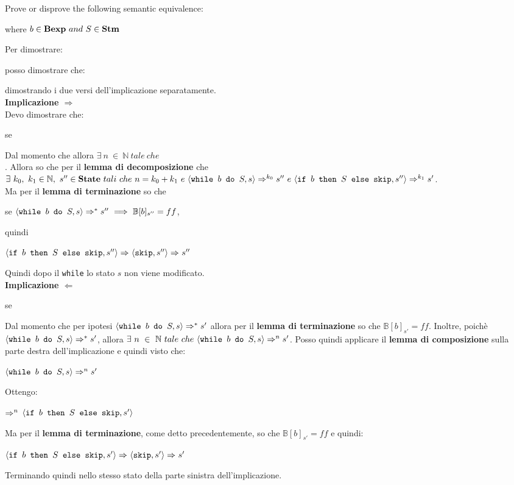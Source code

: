 {
	Prove or disprove the following semantic equivalence:
	\begin{center}
	\exFive{}
	\end{center}
	where $b\in\bexp~and~S\in\stm$
}
{
	Per dimostrare:
	\begin{center}
	\exFive{}
	\end{center}
	posso dimostrare che:
	\begin{center}
	\exFiveIff{}
	\end{center}
	dimostrando i due versi dell'implicazione separatamente.\\

	\textbf{Implicazione $\Longrightarrow{}$}\\
	Devo dimostrare che:
	\begin{center}
	se \exFiveLtR{}
	\end{center}
	Dal momento che \exFiveR{*} allora $\exists~n~\in~\mathbb{N}~tale~che$\\
	. Allora so che per il \textbf{lemma di decomposizione} che 
	$\exists{}~k_0,~k_1\in\mathbb{N},~s''\in\states~tali~che~n=k_0+k_1~e~
	\confSs{\wbS{b}{S}}{s}\Rar{k_0}s''~e~
	\confSs{\ifABC{b}{S}{\skipistr}}{s''}\Rar{k_1}s'$. \\
	Ma per il \textbf{lemma di terminazione} so che 
	\begin{center}
	se $\confSs{\wbS{b}{S}}{s}\Rar{*}s''~\Longrightarrow{}~\mathbb{B}[b]_{s''}=ff$,
	\end{center}
	quindi 
	\begin{center}
	$\confSs{\ifABC{b}{S}{\skipistr}}{s''}\Rar{}
	\confSs{\skipistr}{s''}\Rar{}s''$
	\end{center}
	Quindi dopo il \texttt{while} lo stato $s$ non viene modificato.\\

	\textbf{Implicazione $\Longleftarrow{}$}\\
	\begin{center}
	se \exFiveRtL{}
	\end{center}
	Dal momento che per ipotesi $\confSs{\wbS{b}{S}}{s}\Rar{*}{s'}$ allora
	per il \textbf{lemma di terminazione} so che $\mathbb{B}[b]_{s'}=ff$.
	Inoltre, poichè $\confSs{\wbS{b}{S}}{s}\Rar{*}{s'}$, allora 
	$\exists~n~\in~\mathbb{N}~tale~che~\confSs{\wbS{b}{S}}{s}\Rar{n}{s'}$.
	Posso quindi applicare il \textbf{lemma di composizione} sulla parte destra
	dell'implicazione e quindi visto che:
	\begin{center}
	$\confSs{\wbS{b}{S}}{s}\Rar{n}{s'}$
	\end{center}
	Ottengo:
	\begin{center}
	$\Rar{n}$
	$\confSs{\ifABC{b}{S}{\skipistr}}{s'}$
	\end{center}
	Ma per il \textbf{lemma di terminazione}, come detto precedentemente, so che
	$\mathbb{B}[b]_{s'}=ff$ e quindi:
	\begin{center}
	$\confSs{\ifABC{b}{S}{\skipistr}}{s'}\Rar{}\confSs{\skipistr}{s'}\Rar{}s'$
	\end{center}
	Terminando quindi nello stesso stato della parte sinistra dell'implicazione.
}
\newpage